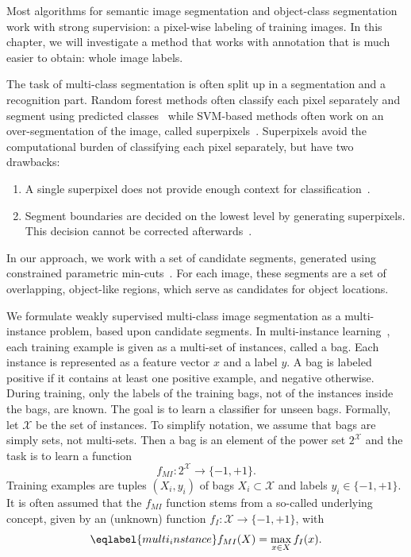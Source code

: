 Most algorithms for semantic image segmentation and object-class segmentation work with strong supervision: a pixel-wise labeling
of training images. In this chapter, we will investigate a method that works with annotation
that is much easier to obtain: whole image labels.


The task of multi-class segmentation is often split up in a segmentation
and a recognition part. Random forest methods often classify each pixel
separately and segment using predicted classes~\citep{schroff2008object} while SVM-based methods often work on an
over-segmentation of the image, called superpixels~\citep{ladicky2009associative,gonfaus2010harmony}. Superpixels avoid the
computational burden of classifying each pixel separately, but have
two drawbacks:
\begin{enumerate}
    \item A single superpixel does not provide enough context for classification~\citep{fulkerson2009class}.
    \item Segment boundaries are decided on the lowest level by generating
        superpixels. This decision cannot be corrected afterwards~\citep{hanbury2008superpixels}.
\end{enumerate}
In our approach, we work with a set of candidate segments, generated using constrained parametric min-cuts~\citep{carreira2010constrained}.
For each image, these segments are a set of overlapping, object-like regions, which serve
as candidates for object locations.

We formulate weakly supervised multi-class image segmentation as a multi-instance problem, based upon candidate segments.
In multi-instance learning~\citep{dietterich1997solving}, each training example is given as a multi-set of instances, called a bag.
Each instance is represented as a feature vector $x$ and a label $y$.
A bag is labeled positive if it contains at least one positive example, and negative otherwise.
During training, only the labels of the training bags, not of the instances inside the bags, are known.
The goal is to learn a classifier for unseen bags. 
Formally, let $\mathcal{X}$ be the set of instances. To simplify notation, we assume that bags are simply sets, not multi-sets.
Then a bag is an element of the power set $2^\mathcal{X}$ and the task is
to learn a function
\begin{equation} f_{MI} \colon 2^\mathcal{X} \rightarrow \{-1,+1\}.  \end{equation}
Training examples are tuples $(X_i,y_i)$ of bags $X_i \subset \mathcal{X}$ and labels $y_i \in \{-1,+1\}$.
It is often assumed that the $f_{MI}$ function stems from a so-called underlying concept, given by an (unknown) function
$f_{I} \colon \mathcal{X} \rightarrow \{-1,+1\}$, with 
\begin{equation}\eqlabel{multi_instance}
f_{MI}(X)= \max_{x \in X} f_{I}(x).
\end{equation}

